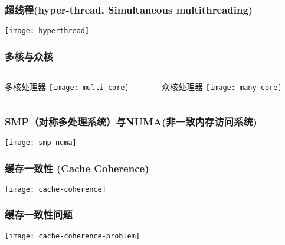 \begin{frame}	
	\frametitle{超线程\small{(hyper-thread, Simultaneous multithreading)}}
	\centering
	
	\texttt{[image: hyperthread]}
\end{frame}

\begin{frame}
    \frametitle{多核与众核}	
	\begin{columns}
		\begin{column}{.5\textwidth}
			\Large
			多核处理器	
			\texttt{[image: multi-core]}
			
		\end{column}
		
		\begin{column}{.5\textwidth}
			\Large
			众核处理器
			\texttt{[image: many-core]}
			
		\end{column}
	\end{columns}
\end{frame}

\begin{frame}	
	\frametitle{SMP（对称多处理系统）与NUMA(非一致内存访问系统)}
	\centering
	\texttt{[image: smp-numa]}
\end{frame}


\begin{frame}	
	\frametitle{缓存一致性 (Cache Coherence)}
	\centering
	\Large 
	\texttt{[image: cache-coherence]}
\end{frame}

\begin{frame}	
	\frametitle{缓存一致性问题}
	\centering
	\Large 
	\texttt{[image: cache-coherence-problem]}
\end{frame}


